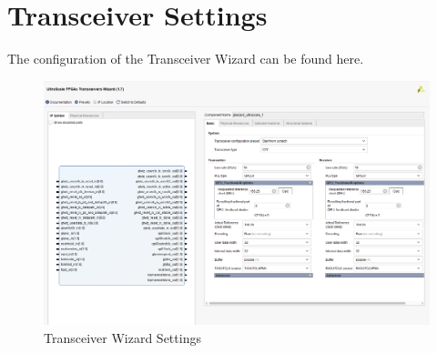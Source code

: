 \documentclass[oneside]{discothesis}
\begin{document}
\tableofcontents

\mainmatter %










\appendix
\chapter{Transceiver Settings}%
\label{cha:transceiver_settings}



The configuration of the Transceiver Wizard can be found here.

\begin{figure}[ht]
    \centering
    \hspace*{-2cm}\includegraphics[width=1.3\linewidth]{img/transceiver1.png}
    \caption{Transceiver Wizard Settings}%
    \label{fig:transceiver1}
\end{figure}

\cleardoublepage
\end{document}
